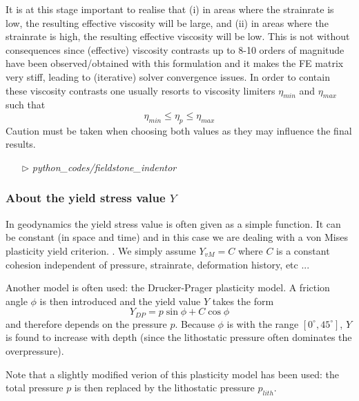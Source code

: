 
It is at this stage important to realise that (i) in areas where the strainrate is low, the resulting effective viscosity will be large, and 
(ii) in areas where the strainrate is high, the resulting effective viscosity will be low. This is not without consequences since 
(effective) viscosity contrasts up to 8-10 orders of magnitude have been observed/obtained with this formulation and it makes the FE 
matrix very stiff, leading to (iterative) solver convergence issues.
In order to contain these viscosity contrasts one usually resorts to viscosity limiters $\eta_{min}$ and $\eta_{max}$ such that 
\[
\eta_{min} \leq \eta_p \leq \eta_{max}
\]
Caution must be taken when choosing both values as they may influence the final results.

\begin{mdframed}[backgroundcolor=green!5]
\begin{itemize}
\item[$\triangleright$] {\sl python\_codes/fieldstone\_indentor}
\end{itemize}
\end{mdframed}

\subsubsection{About the yield stress value $Y$}

In geodynamics the yield stress value is often given as a simple function. 
It can be constant (in space and time) and in this case we are dealing with a von Mises plasticity yield criterion. 
. We simply assume $Y_{vM}=C$ where $C$ is a constant cohesion independent of pressure, strainrate,
deformation history, etc ... 

Another model is often used: the Drucker-Prager plasticity model. 
A friction angle $\phi$ is then introduced and the yield value $Y$ takes the form
\[
Y_{DP}=p \sin\phi + C \cos \phi
\]
and therefore depends on the pressure $p$. Because $\phi$ is with the range $[0^\circ,45^\circ]$, $Y$ is
found to increase with depth (since the lithostatic pressure often dominates the overpressure).

Note that a slightly modified verion of this plasticity model has been used: the total pressure $p$
is then replaced by the lithostatic pressure $p_{lith}$.




